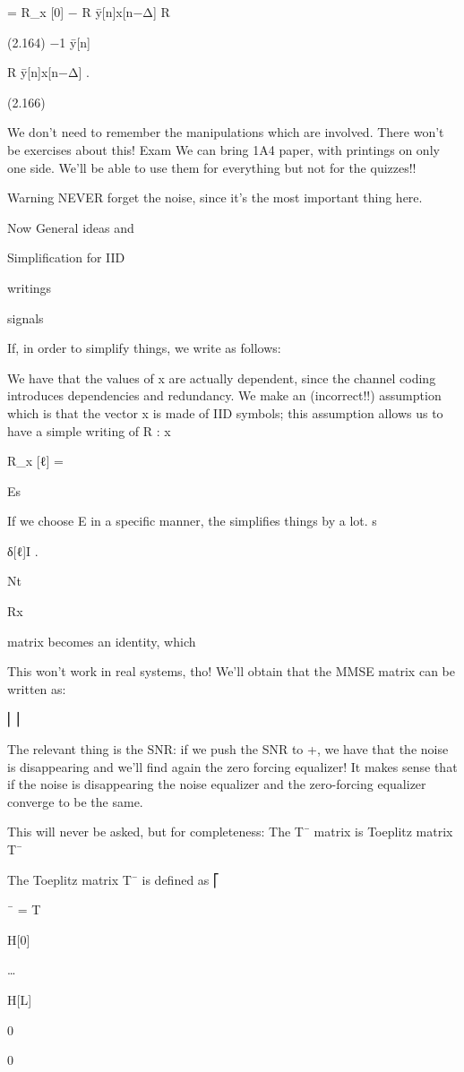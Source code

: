 {= R_x [0] − R ȳ[n]x[n−Δ] R

(2.164)
−1 ȳ[n]

R ȳ[n]x[n−Δ] .

(2.166)

We don't need to remember the manipulations which are involved.
There won't be exercises about this!
Exam We can bring 1A4 paper, with printings on only one side. We'll be able to use them for everything but not for the quizzes!!

Warning NEVER forget the noise, since it's the most important thing here.

Now General ideas and

Simplification for IID

writings

signals

If, in order to simplify things, we write as follows:

We have that the values of x are actually dependent, since the channel coding introduces dependencies and redundancy.
We make an (incorrect!!) assumption which is that the vector x is made of IID symbols;
this assumption allows us to have a simple writing of R :
x

R_x [ℓ] =

Es

If we choose E in a specific manner, the simplifies things by a lot.
s

δ[ℓ]I .

Nt

Rx

matrix becomes an identity, which

This won't work in real systems, tho!
We'll obtain that the MMSE matrix can be written as:

⎢⎥

The relevant thing is the SNR: if we push the SNR to +\infty, we have that the noise is disappearing and we'll find again the zero forcing equalizer!
It makes sense that if the noise is disappearing the noise equalizer and the zero-forcing equalizer converge to be the same.

​This will never be asked, but for completeness:
The T¯ matrix is Toeplitz matrix T¯

The Toeplitz matrix T¯ is defined as
⎡

¯ =
T

H[0]

…

H[L]

0

0

}

